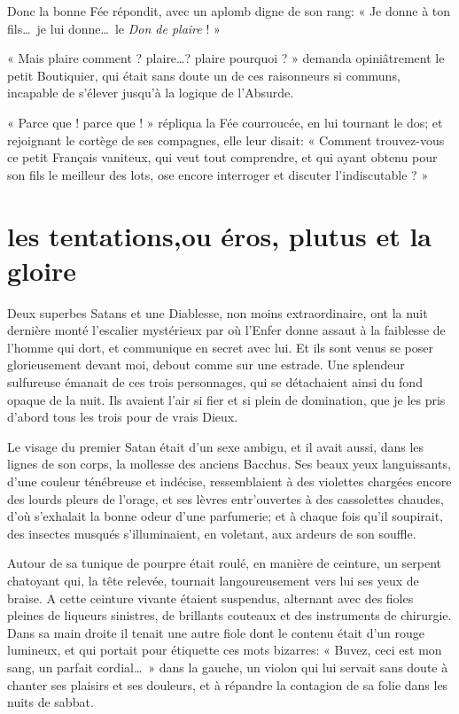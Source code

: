 Donc la bonne Fée répondit, avec un aplomb digne de son rang: « Je donne
à ton fils\ldots\ je lui donne\ldots\ le \textit{Don de plaire} ! »

« Mais plaire comment ? plaire\ldots ? plaire pourquoi ? » demanda
opiniâtrement le petit Boutiquier, qui était sans doute un de ces
raisonneurs si communs, incapable de s’élever
jusqu’à la logique de l’Absurde.

« Parce que ! parce que ! » répliqua la Fée courroucée, en lui tournant
le dos; et rejoignant le cortège de ses compagnes, elle leur disait: «
Comment trouvez{}-vous ce petit Français vaniteux, qui veut tout
comprendre, et qui ayant obtenu pour son fils le meilleur des lots, ose
encore interroger et discuter l’indiscutable ? »

\quebra\section[Les tentations, ou éros, plutus et la gloire]{les tentations,\break ou éros, plutus et la gloire }

Deux superbes Satans et une Diablesse, non moins extraordinaire, ont la
nuit dernière monté l’escalier mystérieux par où
l’Enfer donne assaut à la faiblesse de
l’homme qui dort, et communique en secret avec lui. Et
ils sont venus se poser glorieusement devant moi, debout comme sur une
estrade. Une splendeur sulfureuse émanait de ces trois personnages, qui
se détachaient ainsi du fond opaque de la nuit. Ils avaient
l’air si fier et si plein de domination, que je les
pris d’abord tous les trois pour de vrais Dieux.

Le visage du premier Satan était d’un sexe ambigu, et
il avait aussi, dans les lignes de son corps, la mollesse des anciens
Bacchus. Ses beaux yeux languissants, d’une couleur
ténébreuse et indécise, ressemblaient à des violettes chargées encore
des lourds pleurs de l’orage, et ses lèvres
entr’ouvertes à des cassolettes chaudes,
d’où s’exhalait la bonne odeur
d’une parfumerie; et à chaque fois
qu’il soupirait, des insectes musqués
s’illuminaient, en voletant, aux ardeurs de son
souffle.

Autour de sa tunique de pourpre était roulé, en manière de ceinture, un
serpent chatoyant qui, la tête relevée, tournait langoureusement vers
lui ses yeux de braise. A cette ceinture vivante étaient suspendus,
alternant avec des fioles pleines de liqueurs sinistres, de brillants
couteaux et des instruments de chirurgie. Dans sa main droite il tenait
une autre fiole dont le contenu était d’un rouge
lumineux, et qui portait pour étiquette ces mots bizarres: « Buvez,
ceci est mon sang, un parfait cordial\ldots\ » dans la gauche, un violon qui
lui servait sans doute à chanter ses plaisirs et ses douleurs, et à
répandre la contagion de sa folie dans les nuits de sabbat.

